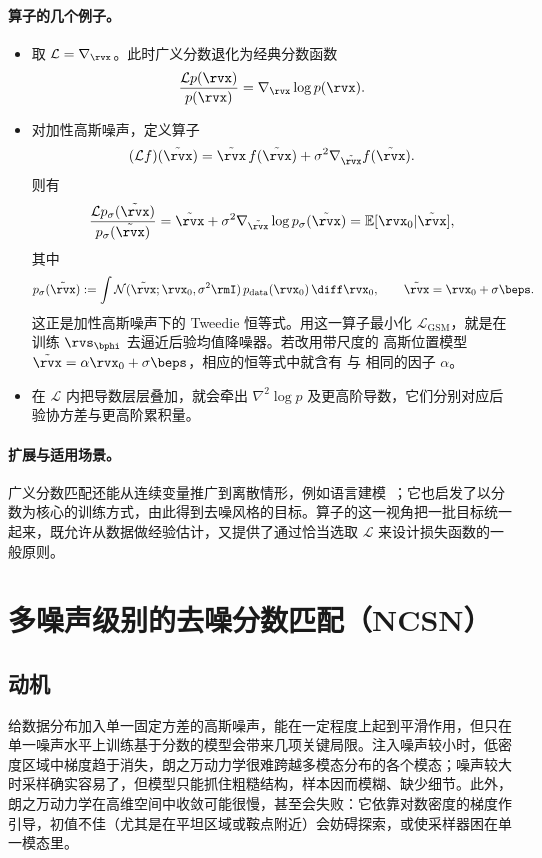 \paragraph{算子的几个例子。}
\begin{itemize}
\item {} 取 $\mathcal L = \nabla_{\rvx}$。此时广义分数退化为经典分数函数
\[
\frac{\mathcal L p(\rvx)}{p(\rvx)}
= \nabla_{\rvx}\log p(\rvx).
\]
\item {}
对加性高斯噪声，定义算子
\[
(\mathcal L f)(\tilde{\rvx})
= \tilde{\rvx}\,f(\tilde{\rvx}) + \sigma^2\nabla_{\tilde{\rvx}} f(\tilde{\rvx}).
\]
则有
\[
\frac{\mathcal L p_\sigma(\tilde{\rvx})}{p_\sigma(\tilde{\rvx})}
= \tilde{\rvx} + \sigma^2\nabla_{\tilde{\rvx}}\log p_\sigma(\tilde{\rvx})
= \mathbb E[\rvx_0|\tilde{\rvx}],
\]
其中
\[
p_\sigma(\tilde\rvx)
:=
\int
\mathcal{N}(\tilde\rvx;\rvx_0,\sigma^2\rmI)
\,p_{\mathrm{data}}(\rvx_0)\,\diff\rvx_0,
\qquad
\tilde\rvx=\rvx_0+\sigma\beps.
\]
这正是加性高斯噪声下的 Tweedie 恒等式。用这一算子最小化
$\mathcal{L}_{\mathrm{GSM}}$，就是在训练
$\rvs_{\bphi}$ 去逼近后验均值降噪器。若改用带尺度的 高斯位置模型
$\tilde\rvx=\alpha\rvx_0+\sigma\beps$，相应的恒等式中就含有
与  相同的因子 $\alpha$。


\item {}
在 $\mathcal L$ 内把导数层层叠加，就会牵出 $\nabla^2\log p$ 及更高阶导数，它们分别对应后验协方差与更高阶累积量。
\end{itemize}


\paragraph{扩展与适用场景。}
广义分数匹配还能从连续变量推广到离散情形，例如语言建模~\citep{meng2022concrete,lou2024discrete}；它也启发了以分数为核心的训练方式，由此得到去噪风格的目标。算子的这一视角把一批目标统一起来，既允许从数据做经验估计，又提供了通过恰当选取 $\mathcal L$ 来设计损失函数的一般原则。


\section{\texorpdfstring{多噪声级别的去噪分数匹配（NCSN）}{多噪声级别的去噪分数匹配（NCSN）}}\label{sec:SMLD}

\subsection{动机}
给数据分布加入单一固定方差的高斯噪声，能在一定程度上起到平滑作用，但只在单一噪声水平上训练基于分数的模型会带来几项关键局限。注入噪声较小时，低密度区域中梯度趋于消失，朗之万动力学很难跨越多模态分布的各个模态；噪声较大时采样确实容易了，但模型只能抓住粗糙结构，样本因而模糊、缺少细节。此外，朗之万动力学在高维空间中收敛可能很慢，甚至会失败：它依靠对数密度的梯度作引导，初值不佳（尤其是在平坦区域或鞍点附近）会妨碍探索，或使采样器困在单一模态里。


